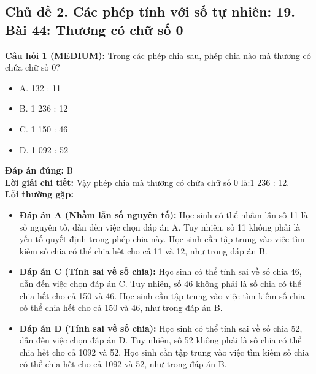 \documentclass{article}
\begin{document}
\subsection{Chủ đề 2. Các phép tính với số tự nhiên: 19. Bài 44: Thương có chữ số 0}
\begin{minipage}{\textwidth}
\noindent\textbf{Câu hỏi 1 (MEDIUM):} Trong các phép chia sau, phép chia nào mà thương có chứa chữ số 0? 
\begin{itemize}[label={}]
    \item A. 132 : 11
    \item B. 1 236 : 12
    \item C. 1 150 : 46
    \item D. 1 092 : 52
\end{itemize}
\textbf{Đáp án đúng:} B \\
\textbf{Lời giải chi tiết:} Vậy phép chia mà thương có chứa chữ số 0 là:1 236 : 12. \\
\textbf{Lỗi thường gặp:}
\begin{itemize}
  \item \textbf{Đáp án A (Nhầm lẫn số nguyên tố):} Học sinh có thể nhầm lẫn số 11 là số nguyên tố, dẫn đến việc chọn đáp án A. Tuy nhiên, số 11 không phải là yếu tố quyết định trong phép chia này. Học sinh cần tập trung vào việc tìm kiếm số chia có thể chia hết cho cả 11 và 12, như trong đáp án B.
  \item \textbf{Đáp án C (Tính sai về số chia):} Học sinh có thể tính sai về số chia 46, dẫn đến việc chọn đáp án C. Tuy nhiên, số 46 không phải là số chia có thể chia hết cho cả 150 và 46. Học sinh cần tập trung vào việc tìm kiếm số chia có thể chia hết cho cả 150 và 46, như trong đáp án B.
  \item \textbf{Đáp án D (Tính sai về số chia):} Học sinh có thể tính sai về số chia 52, dẫn đến việc chọn đáp án D. Tuy nhiên, số 52 không phải là số chia có thể chia hết cho cả 1092 và 52. Học sinh cần tập trung vào việc tìm kiếm số chia có thể chia hết cho cả 1092 và 52, như trong đáp án B.
\end{itemize}
\end{minipage}
\vspace{1em}
\end{document}
